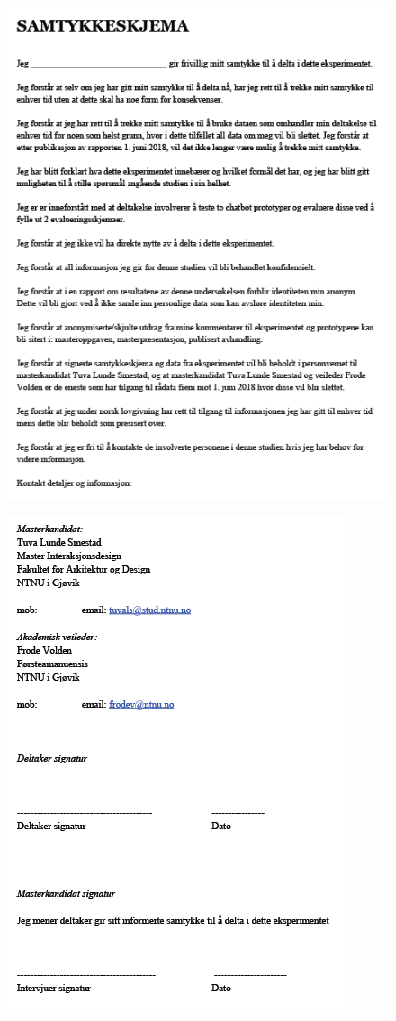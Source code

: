  \begin{figure}[H]
        \centering
        \includegraphics[scale=0.8]{figures/samtykke1.png}
    \end{figure}
    \begin{figure}[H]
        \centering
        \includegraphics[scale=0.8]{figures/samtykke2.png}
    \end{figure}

